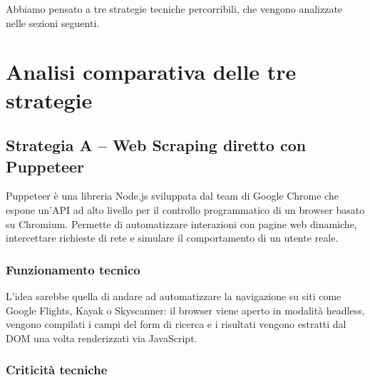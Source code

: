 \documentclass[a4paper, 11pt]{article}
\begin{document}
Abbiamo pensato a tre strategie tecniche percorribili, che vengono analizzate nelle sezioni seguenti.

\section{Analisi comparativa delle tre strategie}

\subsection{Strategia A -- Web Scraping diretto con Puppeteer}

Puppeteer \`e una libreria Node.js sviluppata dal team di Google Chrome che espone un'API ad alto livello per il controllo programmatico di un browser basato su Chromium. Permette di automatizzare interazioni con pagine web dinamiche, intercettare richieste di rete e simulare il comportamento di un utente reale.

\subsubsection{Funzionamento tecnico}

L'idea sarebbe quella di andare ad automatizzare la navigazione su siti come Google Flights, Kayak o Skyscanner: il browser viene aperto in modalit\`a headless, vengono compilati i campi del form di ricerca e i risultati vengono estratti dal DOM una volta renderizzati via JavaScript.

\subsubsection{Criticità tecniche}
\end{document}
